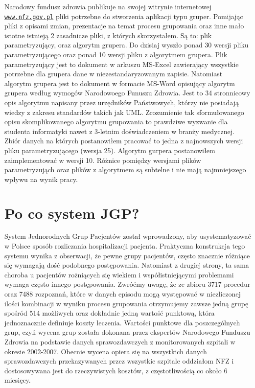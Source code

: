 Narodowy fundusz zdrowia publikuje na swojej witrynie internetowej \underline{\texttt{www.nfz.gov.pl}} pliki potrzebne do stworzenia aplikacji typu gruper. Pomijając pliki z opisami zmian, prezentacje na temat procesu grupowania oraz inne mało istotne istnieją 2 zasadnicze pliki, z których skorzystałem. Są to: plik parametryzujący, oraz algorytm grupera. Do dzisiaj wyszło ponad 30 wersji pliku parametryzującego oraz ponad 10 wersji pliku z algorytmem grupera.
Plik parametryzujący jest to dokument w arkuszu MS-Excel zawierający wszystkie potrzebne dla grupera dane w niezestandaryzowanym zapisie. Natomiast algorytm grupera jest to dokument w formacie MS-Word opisujący algorytm grupera według wymogów Narodowoego Funuszu Zdrowia. Jest to 34 stronnicowy opis algorytmu napisany przez urzędników Państwowych, którzy nie posiadają wiedzy z zakresu standardów takich jak UML. Zrozumienie tak sformułowanego opisu skomplikowanego algorytmu grupowania to prawdziwe wyzwanie dla studenta informatyki nawet z 3-letnim doświadczeniem w branży medycznej. Zbiór danych na których postanowiłem pracować to jedna z najnowszych wersji pliku parametryzującego (wersja 25). Algorytm gurpera postanowiłem zaimplementować w wersji 10. Różnice pomiędzy wersjami plików parametryzująch oraz plików z algorytmem są subtelne i nie mają najmniejszego wpływu na wynik pracy.


\section{Po co system JGP?}
\label{sec:poCoJGP}

System Jednorodnych Grup Pacjentów został wprowadzony, aby usystematyzować w Polsce sposób rozliczania hospitalizacji pacjenta. Praktyczna konstrukcja tego systemu wynika z obserwacji, że pewne grupy pacjentów, często znacznie różniące się wymagają dość podobnego postępowania. Natomiast z drugiej strony, ta sama choroba u pacjentów rożniących się wiekiem i współistniejącymi problemami wymaga często innego postępowania.
Zwróćmy uwagę, że ze zbioru 3717 procedur oraz 7488 rozpoznań, które w danych episodu mogą występować w niezliczonej ilości kombinacji w wyniku procesu grupowania otrzymujemy zawsze jedną grupę spośród 514 możliwych oraz dokładnie jedną wartość punktową, która jednoznacznie definiuje koszty leczenia.
Wartości punktowe dla poszczególnych grup, czyli wycena grup została dokonana przez ekspertów Narodowego Funduszu Zdrowia na podstawie danych sprawozdawczych z monitorowanych szpitali w okresie 2002-2007. Obecnie wycena opiera się na wszystkich danych sprawozdawczych przekazywanych przez wszystkie szpitale oddziałom NFZ i dostosowywana jest do rzeczywistych kosztów, z częstotliwością co około 6 miesięcy.



